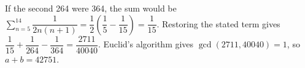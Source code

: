 If the second 264 were 364, the sum would be $\sum_{n=5}^{14}\dfrac{1}{2n(n+1)}=\dfrac{1}{2}(\dfrac{1}{5}-\dfrac{1}{15})=\dfrac{1}{15}$. Restoring the stated term gives $\dfrac{1}{15}+\dfrac{1}{264}-\dfrac{1}{364}=\dfrac{2711}{40040}$. Euclid's algorithm gives $\gcd(2711,40040)=1 $, so $\boxed{a+b=42751}$.

